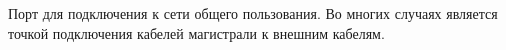 Порт для подключения к сети общего пользования. Во многих
случаях является точкой подключения кабелей магистрали к 
внешним кабелям.